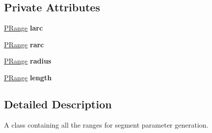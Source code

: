 \subsection*{Private Attributes}
\begin{DoxyCompactItemize}
\item 
\hypertarget{classprocedural_1_1_p_segment_ranges_a6ed525b6efafbcc1c540c5fd56a77125}{\hyperlink{structprocedural_1_1_p_range}{P\-Range} {\bfseries larc}}\label{classprocedural_1_1_p_segment_ranges_a6ed525b6efafbcc1c540c5fd56a77125}

\item 
\hypertarget{classprocedural_1_1_p_segment_ranges_a4ddc4fa60078ce4483c38f3c9a45347f}{\hyperlink{structprocedural_1_1_p_range}{P\-Range} {\bfseries rarc}}\label{classprocedural_1_1_p_segment_ranges_a4ddc4fa60078ce4483c38f3c9a45347f}

\item 
\hypertarget{classprocedural_1_1_p_segment_ranges_ab77335cb7468aca504662604a3a01b6b}{\hyperlink{structprocedural_1_1_p_range}{P\-Range} {\bfseries radius}}\label{classprocedural_1_1_p_segment_ranges_ab77335cb7468aca504662604a3a01b6b}

\item 
\hypertarget{classprocedural_1_1_p_segment_ranges_a43d561a78678057b54e6511a4ec779ab}{\hyperlink{structprocedural_1_1_p_range}{P\-Range} {\bfseries length}}\label{classprocedural_1_1_p_segment_ranges_a43d561a78678057b54e6511a4ec779ab}

\end{DoxyCompactItemize}


\subsection{Detailed Description}
A class containing all the ranges for segment parameter generation. 


